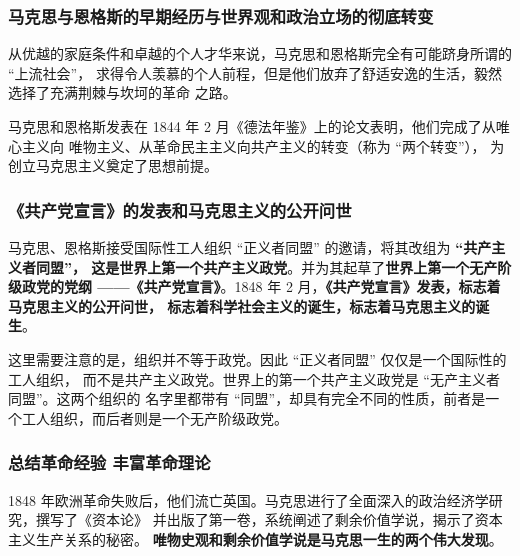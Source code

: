 \documentclass[10pt, UTF8]{book} %
\begin{document}
\subsubsection{马克思与恩格斯的早期经历与世界观和政治立场的彻底转变}

从优越的家庭条件和卓越的个人才华来说，马克思和恩格斯完全有可能跻身所谓的 “上流社会”，
求得令人羡慕的个人前程，但是他们放弃了舒适安逸的生活，毅然选择了充满荆棘与坎坷的革命
之路。

马克思和恩格斯发表在 1844 年 2 月《德法年鉴》上的论文表明，他们完成了从唯心主义向
唯物主义、从革命民主主义向共产主义的转变（称为 “两个转变”），
为创立马克思主义奠定了思想前提。

\subsubsection{《共产党宣言》的发表和马克思主义的公开问世}

马克思、恩格斯接受国际性工人组织 “正义者同盟” 的邀请，将其改组为 \textbf{“共产主义者同盟”，
这是世界上第一个共产主义政党}。并为其起草了\textbf{世界上第一个无产阶级政党的党纲
——《共产党宣言》}。1848 年 2 月，\textbf{《共产党宣言》发表，标志着马克思主义的公开问世，
标志着科学社会主义的诞生，标志着马克思主义的诞生}。
\begin{remark}
    这里需要注意的是，组织并不等于政党。因此 “正义者同盟” 仅仅是一个国际性的工人组织，
    而不是共产主义政党。世界上的第一个共产主义政党是 “无产主义者同盟”。这两个组织的
    名字里都带有 “同盟”，却具有完全不同的性质，前者是一个工人组织，而后者则是一个无产阶级政党。
\end{remark}

\subsubsection{总结革命经验 \quad 丰富革命理论}

1848 年欧洲革命失败后，他们流亡英国。马克思进行了全面深入的政治经济学研究，撰写了《资本论》
并出版了第一卷，系统阐述了剩余价值学说，揭示了资本主义生产关系的秘密。
\textbf{唯物史观和剩余价值学说是马克思一生的两个伟大发现}。
\end{document}
